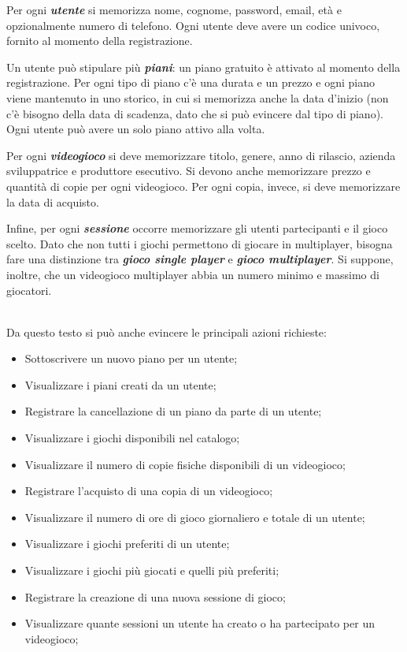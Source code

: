 \documentclass[a4paper,12pt]{report}
\begin{document}
\begin{addmargin}[4em]{4em}
Per ogni \textbf{\textit{utente}} si memorizza nome, cognome, password, email, età e opzionalmente numero di telefono. Ogni utente deve avere un codice univoco, fornito al momento della registrazione.

Un utente può stipulare più \textbf{\textit{piani}}: un piano gratuito è attivato al momento della registrazione. Per ogni tipo di piano c'è una durata e un prezzo e ogni piano viene mantenuto in uno storico, in cui si memorizza anche la data d'inizio (non c'è bisogno della data di scadenza, dato che si può evincere dal tipo di piano). Ogni utente può avere un solo piano attivo alla volta.

Per ogni \textbf{\textit{videogioco}} si deve memorizzare titolo, genere, anno di rilascio, azienda sviluppatrice e produttore esecutivo. Si devono anche memorizzare prezzo e quantità di copie per ogni videogioco. Per ogni copia, invece, si deve memorizzare la data di acquisto.


Infine, per ogni \textbf{\textit{sessione}} occorre memorizzare gli utenti partecipanti e il gioco scelto. Dato che non tutti i giochi permettono di giocare in multiplayer, bisogna fare una distinzione tra \textbf{\textit{gioco single player}} e \textbf{\textit{gioco multiplayer}}. Si suppone, inoltre, che un videogioco multiplayer abbia un numero minimo e massimo di giocatori. \\\\

\end{addmargin}

Da questo testo si può anche evincere le principali azioni richieste:

\begin{itemize}
\item Sottoscrivere un nuovo piano per un utente;
\item Visualizzare i piani creati da un utente;
\item Registrare la cancellazione di un piano da parte di un utente;
\item Visualizzare i giochi disponibili nel catalogo;
\item Visualizzare il numero di copie fisiche disponibili di un videogioco;
\item Registrare l'acquisto di una copia di un videogioco;
\item Visualizzare il numero di ore di gioco giornaliero e totale di un utente;
\item Visualizzare i giochi preferiti di un utente;
\item Visualizzare i giochi più giocati e quelli più preferiti;
\item Registrare la creazione di una nuova sessione di gioco;
\item Visualizzare quante sessioni un utente ha creato o ha partecipato per un videogioco;
\end{itemize}
\end{document}
